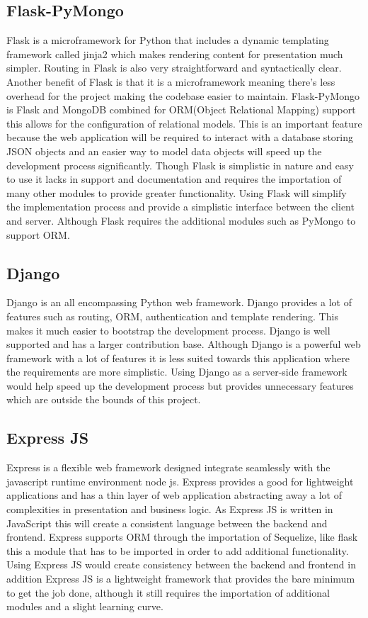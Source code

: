 \documentclass[onecolumn, draftclsnofoot,10pt, compsoc]{IEEEtran}
\begin{document}
\subsection{Flask-PyMongo}
Flask is a microframework for Python that includes a dynamic templating framework called jinja2 which makes rendering content for presentation much simpler. Routing in Flask is also very straightforward and syntactically clear. Another benefit of Flask is that it is a microframework meaning there’s less overhead for the project making the codebase easier to maintain. Flask-PyMongo is Flask and MongoDB combined for ORM(Object Relational Mapping) support this allows for the configuration of relational models. This is an important feature because the web application will be required to interact with a database storing JSON objects and an easier way to model data objects will speed up the development process significantly. Though Flask is simplistic in nature and easy to use it lacks in support and documentation and requires the importation of many other modules to provide greater functionality. Using Flask will simplify the implementation process and provide a simplistic interface between the client and server. Although Flask requires the additional modules such as PyMongo to support ORM.
\subsection{Django}
Django is an all encompassing Python web framework. Django provides a lot of features such as routing, ORM, authentication and template rendering. This makes it much easier to bootstrap the development process. Django is well supported and has a larger contribution base. Although Django is a powerful web framework with a lot of features it is less suited towards this application where the requirements are more simplistic. Using Django as a server-side framework would help speed up the development process but provides unnecessary features which are outside the bounds of this project.  
\subsection{Express JS}
Express is a flexible web framework designed integrate seamlessly with the javascript runtime environment node js. Express provides a good for lightweight applications and has a thin layer of web application abstracting away a lot of complexities in presentation and business logic. As Express JS is written in JavaScript this will create a consistent language between the backend and frontend. Express supports ORM through the importation of Sequelize, like flask this a module that has to be imported in order to add additional functionality. Using Express JS would create consistency between the backend and frontend in addition Express JS is a lightweight framework that provides the bare minimum to get the job done, although it still requires the importation of additional modules and a slight learning curve.
\end{document}
